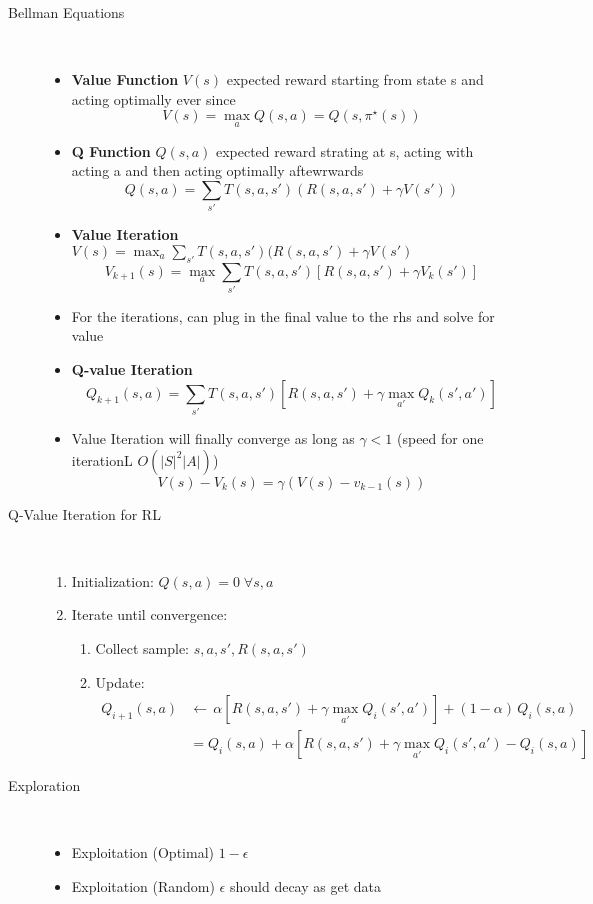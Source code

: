 \documentclass[a4paper, 10pt,landscape]{article}
\begin{document}
\begin{multicols*}{3}
\begin{description}
	\item[Bellman Equations]~
		\begin{itemize}
			\item {\bf Value Function} $V(s)$ expected reward starting from state s and acting optimally ever since
				$$V(s) = \max_{a}Q(s, a) = Q(s,\pi^{\star}(s))$$
			\item {\bf Q Function} $Q(s, a)$ expected reward strating at s, acting with acting a and then acting optimally aftewrwards
				$$Q(s, a)=\sum_{s'}T(s,a,s')(R(s,a,s')+\gamma V(s'))$$
			\item{\bf Value Iteration} $V(s) = \max_{a}\sum_{s'}T(s,a,s')(R(s,a,s')+\gamma V(s')$
				$$V_{k+1}(s) = \max_{a}\sum_{s'}T(s,a,s')[R(s,a,s')+\gamma V_k(s')]$$
			\item For the iterations, can plug in the final value to the rhs and solve for value
			\item {\bf Q-value Iteration} 
				$$Q_{k+1}(s, a)=\sum_{s'}T(s,a,s')[R(s,a,s')+\gamma \max_{a'}Q_{k}(s', a')]$$
			\item Value Iteration will finally converge as long as $\gamma <1$ (speed for one iterationL $O(|S|^2 |A|)$)
				$$V(s) - V_k(s) = \gamma (V(s) - v_{k-1}(s))$$
		\end{itemize}
		\item[Q-Value Iteration for RL] ~
			\begin{enumerate}
				\item Initialization: $Q(s,a)=0\;\forall s,a$
				\item Iterate until convergence:
				\begin{enumerate}
					\item Collect sample: $s,a,s',R(s,a,s')$
					\item Update:
					\begin{align*}
						Q_{i+1}(s,a)&\leftarrow\,\alpha\left[R(s,a,s')+\gamma\max\limits_{a'}Q_i(s',a')\right]+(1-\alpha)\,Q_i(s,a)\\
						&=Q_i(s,a)+\alpha\left[R(s,a,s')+\gamma\max\limits_{a'}Q_i(s',a')-Q_i(s,a)\right]
					\end{align*}
				\end{enumerate}
			\end{enumerate}
		\item[Exploration]~
			\begin{itemize}
				\item Exploitation (Optimal) $1-\epsilon$ 
				\item Exploitation (Random) $\epsilon$ should decay as get data

\end{itemize}
\end{description}
\end{multicols*}
\end{document}

